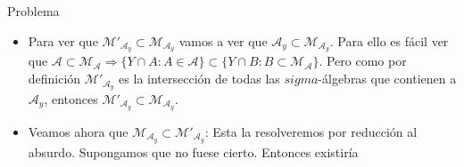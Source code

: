 \documentclass{article}
\begin{document}
\begin{section}{Problema}
\begin{itemize}
	\item Para ver que $\mathcal{M'}_{\mathcal{A}_y} \subset \mathcal{M}_{\mathcal{A}_y}$ vamos a ver que $\mathcal{A}_y \subset \mathcal{M}_{\mathcal{A}_y}$.
	Para ello es fácil ver que $\mathcal{A} \subset \mathcal{M}_{\mathcal{A}} \Longrightarrow \{Y \cap A: A \in \mathcal{A}\} \subset \{Y \cap B: B \subset \mathcal{M}_{\mathcal{A}}\}$.
	Pero como por definición $\mathcal{M'}_{\mathcal{A}_y}$ es la intersección de todas las $sigma$-álgebras que contienen a $\mathcal{A}_y$, entonces $\mathcal{M'}_{\mathcal{A}_y} \subset \mathcal{M}_{\mathcal{A}_y}$.

	\item Veamos ahora que $\mathcal{M}_{\mathcal{A}_y} \subset \mathcal{M'}_{\mathcal{A}_y}$: Esta la resolveremos por reducción al absurdo. Supongamos
	que no fuese cierto. Entonces existiría 

\end{itemize}


\end{section}
\end{document}

